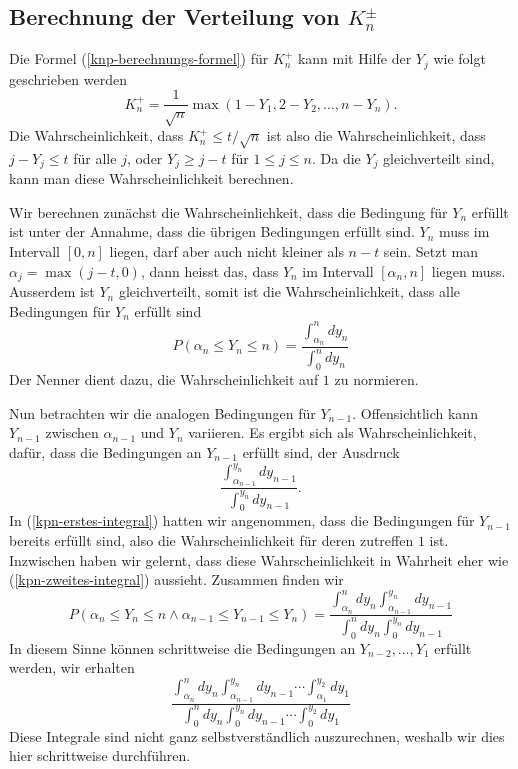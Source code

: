 \subsection{Berechnung der Verteilung von \texorpdfstring{$K_n^{\pm}$}{Kn-plus-minus}}
Die Formel (\ref{knp-berechnungs-formel})
für $K_n^+$ kann mit Hilfe der $Y_j$ wie folgt 
geschrieben werden
\begin{equation}
K_n^+=\frac1{\sqrt{n}}\max(1-Y_1, 2-Y_2,\dots,n-Y_n).
\end{equation}
Die Wahrscheinlichkeit, dass $K_n^+\le t/\sqrt{n}$ ist also die
Wahrscheinlichkeit, dass $j-Y_j\le t$ für alle $j$, oder
$Y_j\ge j-t$ für $1\le j\le n$.
Da die $Y_j$ gleichverteilt sind,
kann man diese Wahrscheinlichkeit berechnen.

Wir berechnen zunächst die Wahrscheinlichkeit, dass die Bedingung
für $Y_n$ erfüllt ist unter der Annahme, dass die übrigen
Bedingungen erfüllt sind.
$Y_n$ muss im Intervall $[0,n]$
liegen, darf aber auch nicht kleiner als $n-t$ sein.
Setzt man $\alpha_j=\max(j-t,0)$, dann heisst das, dass $Y_n$ im
Intervall $[\alpha_n, n]$ liegen muss.
Ausserdem ist $Y_n$ gleichverteilt,
somit ist die Wahrscheinlichkeit, dass alle Bedingungen für $Y_n$ erfüllt
sind
\begin{equation}
P(\alpha_n\le Y_n\le n)=\frac{\int_{\alpha_n}^n dy_n}{\int_0^ndy_n}
\label{kpn-erstes-integral}
\end{equation}
Der Nenner dient dazu, die Wahrscheinlichkeit auf $1$ zu normieren.

Nun betrachten wir die analogen Bedingungen für $Y_{n-1}$.
Offensichtlich kann $Y_{n-1}$ zwischen $\alpha_{n-1}$ und $Y_n$ variieren.
Es ergibt sich
als Wahrscheinlichkeit, dafür, dass die Bedingungen an $Y_{n-1}$ erfüllt
sind, der Ausdruck
\begin{equation}
\frac{\int_{\alpha_{n-1}}^{y_n}dy_{n-1}}{\int_0^{y_n}dy_{n-1}}.
\label{kpn-zweites-integral}
\end{equation}
In (\ref{kpn-erstes-integral}) hatten wir angenommen,
dass die Bedingungen für $Y_{n-1}$
bereits erfüllt sind, also die Wahrscheinlichkeit für deren zutreffen $1$
ist. Inzwischen haben wir gelernt, dass diese Wahrscheinlichkeit in
Wahrheit eher wie (\ref{kpn-zweites-integral}) aussieht.
Zusammen finden wir
\begin{equation}
P(\alpha_n\le Y_n\le n\wedge \alpha_{n-1}\le Y_{n-1}\le Y_n)
=
\frac{\int_{\alpha_n}^n dy_n\int_{\alpha_{n-1}}^{y_n}dy_{n-1}}{\int_0^ndy_n\int_0^{y_n}dy_{n-1}}
\label{kpn-zwei-integrale}
\end{equation}
In diesem Sinne können schrittweise die Bedingungen an $Y_{n-2},\dots,Y_1$
erfüllt werden, wir erhalten
\begin{equation}
\frac{\int_{\alpha_n}^n dy_n\int_{\alpha_{n-1}}^{y_n}dy_{n-1}\dotsi\int_{\alpha_1}^{y_2}dy_1}{\int_0^ndy_n\int_0^{y_n}dy_{n-1}\dotsi\int_0^{y_2}dy_1}
\label{kpn-alle-integrale}
\end{equation}
Diese Integrale sind nicht ganz selbstverständlich auszurechnen, weshalb
wir dies hier schrittweise durchführen.

